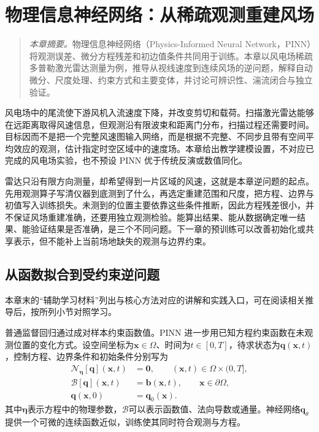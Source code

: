 ﻿\chapter{物理信息神经网络：从稀疏观测重建风场}
\label{chap:pinn}
\begin{quote}\small
\textit{本章摘要。}物理信息神经网络（Physics-Informed Neural Network，PINN）将观测误差、微分方程残差和初边值条件共同用于训练。本章以风电场稀疏多普勒激光雷达测量为例，推导从视线速度到连续风场的逆问题，解释自动微分、尺度处理、约束方式和主要变体，并讨论可辨识性、湍流闭合与独立验证。
\end{quote}


风电场中的尾流使下游风机入流速度下降，并改变剪切和载荷。扫描激光雷达能够在远距离取得风速信息，但观测沿有限波束和距离门分布，扫描过程还需要时间。目标因而不是把一个完整风速图输入网络，而是根据不完整、不同步且带有空间平均效应的观测，估计指定时空区域中的速度场。本章给出教学建模设置，不对应已完成的风电场实验，也不预设 PINN 优于传统反演或数值同化。

雷达只沿有限方向测量，却希望得到一片区域的风速，这就是本章逆问题的起点。先用观测算子写清仪器到底测到了什么，再选定重建范围和尺度，把方程、边界与初值写入训练损失。未测到的位置主要依靠这些条件推断，因此方程残差很小，并不保证风场重建准确，还要用独立观测检验。能算出结果、能从数据确定唯一结果、能验证结果是否准确，是三个不同问题。下一章的预训练可以改善初始化或共享表示，但不能补上当前场地缺失的观测与边界约束。


\section{从函数拟合到受约束逆问题}
\label{sec:pinn-formulation}

本章末的“辅助学习材料”列出与核心方法对应的讲解和实践入口，可在阅读相关推导后，按所列小节对照学习。

普通监督回归通过成对样本约束函数值。PINN 进一步用已知方程约束函数在未观测位置的变化方式。设空间坐标为$\mathbf{x}\in\Omega$、时间为$t\in[0,T]$，待求状态为$\mathbf{q}(\mathbf{x},t)$，控制方程、边界条件和初始条件分别写为
\begin{align}
 \mathcal N_{\boldsymbol\eta}[\mathbf q](\mathbf x,t)&=\mathbf0,\qquad (\mathbf x,t)\in\Omega\times(0,T],\\
 \mathcal B[\mathbf q](\mathbf x,t)&=\mathbf b(\mathbf x,t),\qquad \mathbf x\in\partial\Omega,\\
 \mathbf q(\mathbf x,0)&=\mathbf q_0(\mathbf x).
\end{align}
其中$\boldsymbol\eta$表示方程中的物理参数，$\mathcal B$可以表示函数值、法向导数或通量。神经网络$\mathbf q_\theta$提供一个可微的连续函数近似，训练使其同时符合观测与方程\cite{raissi2019pinn,karniadakis2021physics}。

